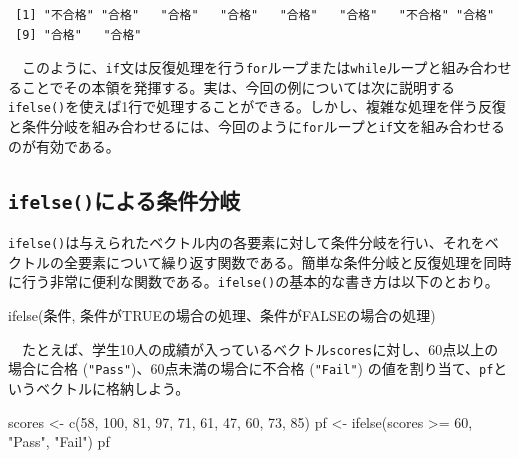 \documentclass[
  a4paper,
  pandoc,
  ja=standard,
  jafont=haranoaji]{bxjsbook}
\newenvironment{Shaded}{\begin{snugshade}}{\end{snugshade}}
\newcommand{\DecValTok}[1]{\textcolor[rgb]{0.68,0.00,0.00}{#1}}
\newcommand{\FunctionTok}[1]{\textcolor[rgb]{0.28,0.35,0.67}{#1}}
\newcommand{\NormalTok}[1]{\textcolor[rgb]{0.00,0.48,0.65}{#1}}
\newcommand{\OtherTok}[1]{\textcolor[rgb]{0.00,0.48,0.65}{#1}}
\newcommand{\SpecialCharTok}[1]{\textcolor[rgb]{0.37,0.37,0.37}{#1}}
\newcommand{\StringTok}[1]{\textcolor[rgb]{0.13,0.47,0.30}{#1}}
\begin{document}
\begin{verbatim}
 [1] "不合格" "合格"   "合格"   "合格"   "合格"   "合格"   "不合格" "合格"  
 [9] "合格"   "合格"  
\end{verbatim}

　このように、\texttt{if}文は反復処理を行う\texttt{for}ループまたは\texttt{while}ループと組み合わせることでその本領を発揮する。実は、今回の例については次に説明する\texttt{ifelse()}を使えば1行で処理することができる。しかし、複雑な処理を伴う反復と条件分岐を組み合わせるには、今回のように\texttt{for}ループと\texttt{if}文を組み合わせるのが有効である。

\hypertarget{ifelseux306bux3088ux308bux6761ux4ef6ux5206ux5c90}{%
\subsection{\texorpdfstring{\texttt{ifelse()}による条件分岐}{ifelse()による条件分岐}}\label{ifelseux306bux3088ux308bux6761ux4ef6ux5206ux5c90}}

\texttt{ifelse()}は与えられたベクトル内の各要素に対して条件分岐を行い、それをベクトルの全要素について繰り返す関数である。簡単な条件分岐と反復処理を同時に行う非常に便利な関数である。\texttt{ifelse()}の基本的な書き方は以下のとおり。

\begin{Shaded}
\begin{Highlighting}[]
\FunctionTok{ifelse}\NormalTok{(条件, 条件がTRUEの場合の処理、条件がFALSEの場合の処理)}
\end{Highlighting}
\end{Shaded}

　たとえば、学生10人の成績が入っているベクトル\texttt{scores}に対し、60点以上の場合に合格
(\texttt{"Pass"})、60点未満の場合に不合格 (\texttt{"Fail"})
の値を割り当て、\texttt{pf}というベクトルに格納しよう。

\begin{Shaded}
\begin{Highlighting}[numbers=left,,]
\NormalTok{scores }\OtherTok{\textless{}{-}} \FunctionTok{c}\NormalTok{(}\DecValTok{58}\NormalTok{, }\DecValTok{100}\NormalTok{, }\DecValTok{81}\NormalTok{, }\DecValTok{97}\NormalTok{, }\DecValTok{71}\NormalTok{, }\DecValTok{61}\NormalTok{, }\DecValTok{47}\NormalTok{, }\DecValTok{60}\NormalTok{, }\DecValTok{73}\NormalTok{, }\DecValTok{85}\NormalTok{)}
\NormalTok{pf }\OtherTok{\textless{}{-}} \FunctionTok{ifelse}\NormalTok{(scores }\SpecialCharTok{\textgreater{}=} \DecValTok{60}\NormalTok{, }\StringTok{"Pass"}\NormalTok{, }\StringTok{"Fail"}\NormalTok{)}
\NormalTok{pf}
\end{Highlighting}
\end{Shaded}
\end{document}
